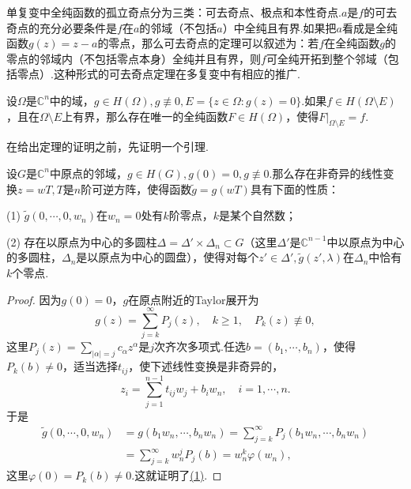 单复变中全纯函数的孤立奇点分为三类：可去奇点、极点和本性奇点.$a$是$f$的可去奇点的充分必要条件是$f$在$a$的邻域（不包括$a$）中全纯且有界.如果把$a$看成是全纯函数$g(z)=z-a$的零点，那么可去奇点的定理可以叙述为：若$f$在全纯函数$g$的零点的邻域内（不包括零点本身）全纯并且有界，则$f$可全纯开拓到整个邻域（包括零点）.这种形式的可去奇点定理在多复变中有相应的推广.
\begin{theorem}\label{thm1.6.1}
	设$\Omega$是$\mathbb{C}^n$中的域，$g\in H(\Omega),g\not\equiv0,E=\{z\in\Omega\colon g(z)=0\}$.如果$f\in H(\Omega\setminus E)$，且在$\Omega\setminus E$上有界，那么存在唯一的全纯函数$F\in H(\Omega)$，使得$F|_{\Omega\setminus E}=f$.
\end{theorem}
在给出定理的证明之前，先证明一个引理.
\begin{lemma}\label{lem1.6.2}
	设$G$是$\mathbb{C}^n$中原点的邻域，$g\in H(G),g(0)=0,g\not\equiv0$.那么存在非奇异的线性变换$z=wT,T$是$n$阶可逆方阵，使得函数$\tilde{g}=g(wT)$具有下面的性质：
	
	(1)\hypertarget{1.6.2}{}
	$\tilde{g}(0,\cdots,0,w_n)$在$w_n=0$处有$k$阶零点，$k$是某个自然数；
	
	(2)\hypertarget{1.6.2}{}
	存在以原点为中心的多圆柱$\Delta=\Delta'\times\Delta_n\subset G$（这里$\Delta'$是$\mathbb{C}^{n-1}$中以原点为中心的多圆柱，$\Delta_n$是以原点为中心的圆盘），使得对每个$z'\in\Delta',\tilde{g}(z',\lambda)$在$\Delta_n$中恰有$k$个零点.
	\begin{proof}
		因为$g(0)=0$，$g$在原点附近的Taylor展开为
		\[g(z)=\sum_{j=k}^{\infty}P_j(z),\quad k\ge1,\quad P_k(z)\not\equiv0,\]
		这里$P_j(z)=\sum\limits_{|\alpha|=j}c_\alpha z^\alpha$是$j$次齐次多项式.任选$b=(b_1,\cdots,b_n)$，使得$P_k(b)\neq0$，适当选择$t_{ij}$，使下述线性变换是非奇异的，
		\[z_i=\sum_{j=1}^{n-1} t_{ij}w_j+b_i w_n,\quad i=1,\cdots,n.\]
		于是
		\begin{align*}
			\tilde{g}(0,\cdots,0,w_n)
			&=g(b_1w_n,\cdots,b_nw_n)=\sum_{j=k}^{\infty}P_j(b_1w_n,\cdots,b_nw_n)\\
			&=\sum_{j=k}^{\infty}w_n^j P_j(b)=w_n^k\varphi(w_n),
		\end{align*}
	这里$\varphi(0)=P_k(b)\neq0$.这就证明了\hyperlink{1.6.2}{(1)}.
	

\end{proof}
\end{lemma}
